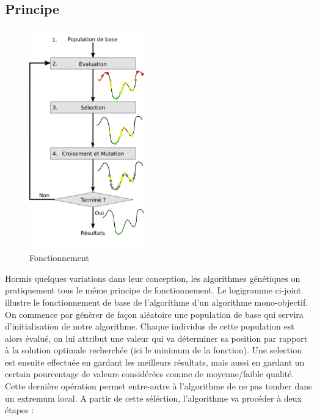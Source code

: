 \documentclass[12pt]{report}
\begin{document}
      \subsection{Principe}
        \begin{figure}
          \centering
          \includegraphics[width=5cm]{img/schema_algo_single.png}
          \caption{Fonctionnement}
        \end{figure}
        Hormis quelques variations dans leur conception, les algorithmes génétiques on pratiquement tous le même principe de fonctionnement.
        Le logigramme ci-joint illustre le fonctionnement de base de l'algorithme d'un algorithme mono-objectif.
        On commence par génèrer de façon aléatoire une population de base qui servira d'initialisation de notre algorithme.
        Chaque individus de cette population est alors évalué, on lui attribut une valeur qui va déterminer sa position par rapport à la solution optimale recherchée (ici le minimum de la fonction).
        Une selection est ensuite effectuée en gardant les meilleurs résultats, mais aussi en gardant un certain pourcentage de valeurs considérées comme de moyenne/faible qualité. Cette dernière opération permet entre-autre à l'algorithme de ne pas tomber dans un extremum local.
        A partir de cette séléction, l'algorithme va procéder à deux étapes :
\end{document}
